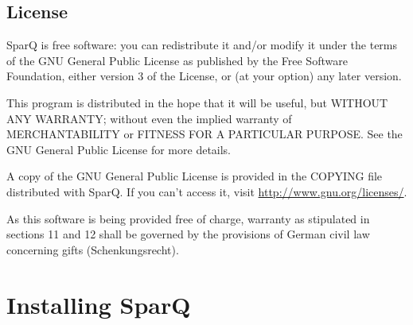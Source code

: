 \documentclass[headsepline]{scrreprt}
\theoremstyle{definition}
\newcommand{\engine}{SparQ}
\begin{document}

\section*{License}

SparQ is free software: you can redistribute it and/or modify
it under the terms of the GNU General Public License as published by
the Free Software Foundation, either version 3 of the License, or
(at your option) any later version.

 This program is distributed in the hope that it will be useful,
 but WITHOUT ANY WARRANTY; without even the implied warranty of
 MERCHANTABILITY or FITNESS FOR A PARTICULAR PURPOSE.  See the
 GNU General Public License for more details.

A copy of the GNU General Public License is provided in the COPYING file
distributed with SparQ. If you can't access it, visit \url{http://www.gnu.org/licenses/}.

As this software is being provided free of charge,
warranty as stipulated in sections 11 and 12 shall be governed by the
provisions of German civil law concerning gifts (Schenkungsrecht).

\chapter{Installing \engine}
\label{sec:inst-ri-engine}
\end{document}
